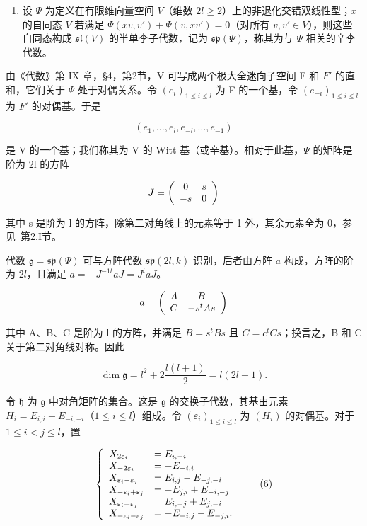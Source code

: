 \begin{enumerate}
\def\labelenumi{(\Roman{enumi})}
\tightlist
\item
设 \(\varPsi\) 为定义在有限维向量空间 \(V\)（维数 \(2l \geq 2\)）上的非退化交错双线性型；\(x\) 的自同态 \(V\) 若满足 \(\varPsi(xv, v') + \varPsi(v, xv') = 0\)（对所有 \(v, v' \in V\)），则这些自同态构成 \(\mathfrak{sl}(V)\) 的半单李子代数，记为 \(\mathfrak{sp}(\varPsi)\)，称其为与 \(\varPsi\) 相关的辛李代数。
\end{enumerate}

由《代数》第 IX 章，§4，第2节，V 可写成两个极大全迷向子空间 F 和 \(F'\) 的直和，它们关于 \(\Psi\) 处于对偶关系。令 \((e_{i})_{1\leq i\leq l}\) 为 F 的一个基，令 \((e_{-i})_{1\leq i\leq l}\) 为 \(F'\) 的对偶基。于是

\[
(e _ {1}, \dots , e _ {l}, e _ {- l}, \dots , e _ {- 1})
\]

是 V 的一个基；我们称其为 V 的 Witt 基（或辛基）。相对于此基，\(\varPsi\) 的矩阵是阶为 2l 的方阵

\[
J = \left( \begin{array}{c c} 0 & s \\ - s & 0 \end{array} \right)
\]

其中 s 是阶为 l 的方阵，除第二对角线上的元素等于 1 外，其余元素全为 0，参见~第2.I节。

代数 \(\mathfrak{g} = \mathfrak{sp}(\varPsi)\) 可与方阵代数 \(\mathfrak{sp}(2l,k)\) 识别，后者由方阵 \(a\) 构成，方阵的阶为 \(2l\)，且满足 \(a = -J^{-1t}aJ = J^t aJ\)。

\[
a = \left( \begin{array}{c c} A & B \\ C & - s ^ {t} A s \end{array} \right)
\]

其中 A、B、C 是阶为 l 的方阵，并满足 \(B = s^{t}Bs\) 且 \(C = c^{t}Cs\)；换言之，B 和 C 关于第二对角线对称。因此

\[
\dim \mathfrak {g} = l ^ {2} + 2 \frac {l (l + 1)}{2} = l (2 l + 1).
\]

令 \(\mathfrak{h}\) 为 \(\mathfrak{g}\) 中对角矩阵的集合。这是 \(\mathfrak{g}\) 的交换子代数，其基由元素 \(H_{i} = E_{i,i} - E_{-i,-i}\)（\(1 \leq i \leq l\)）组成。令 \((\varepsilon_{i})_{1 \leq i \leq l}\) 为 \((H_{i})\) 的对偶基。对于 \(1 \leq i < j \leq l\)，置

\[
\left\{ \begin{array}{l l} X _ {2 \varepsilon_ {i}} & = E _ {i, - i} \\ X _ {- 2 \varepsilon_ {i}} & = - E _ {- i, i} \\ X _ {\varepsilon_ {i} - \varepsilon_ {j}} & = E _ {i, j} - E _ {- j, - i} \\ X _ {- \varepsilon_ {i} + \varepsilon_ {j}} & = - E _ {j, i} + E _ {- i, - j} \\ X _ {\varepsilon_ {i} + \varepsilon_ {j}} & = E _ {i, - j} + E _ {j, - i} \\ X _ {- \varepsilon_ {i} - \varepsilon_ {j}} & = - E _ {- i, j} - E _ {- j, i}. \end{array} \right.\tag{6}
\]

